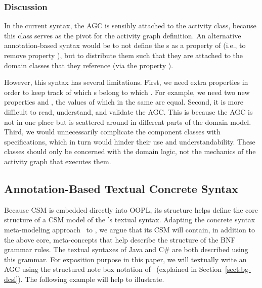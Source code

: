 \subsubsection*{Discussion} \label{sect:agl-discussion} %
In the current syntax, the AGC is sensibly attached to the activity class, because this class serves as the pivot for the activity graph definition.
%
An alternative annotation-based syntax would be to not define the s as a property of  (i.e., to remove property ), but to distribute them such that they are attached to the domain classes that they reference (via the property ). 

However, this syntax has several limitations. First, we need extra properties in order to keep track of which s belong to which . For example, we need two new properties  and , the values of which in the same  are equal. 
Second, it is more difficult to read, understand, and validate the AGC. This is because the AGC is not in one place but is scattered around in different parts of the domain model.
Third, we would unnecessarily complicate the component classes with  specifications, which in turn would hinder their use and understandability. These classes should only be concerned with the domain logic, not the mechanics of the activity graph that executes them.

\subsection{Annotation-Based Textual Concrete Syntax} 
\label{sect:agl-csSyntax}

Because CSM is embedded directly into OOPL, its structure helps define the core structure of a CSM model of the \agl's textual syntax. Adapting the concrete syntax meta-modeling approach~\cite{kleppe_software_2008} to \agl, we argue that its CSM will contain, in addition to the above core, meta-concepts that help describe the structure of the BNF grammar rules. The textual syntaxes of Java and C\# are both described using this grammar.
%
For exposition purpose in this paper, we will textually write an AGC using the structured note box notation of \dcsl~(explained in Section~\ref{sect:bg-dcsl}). The following example will help to illustrate.


